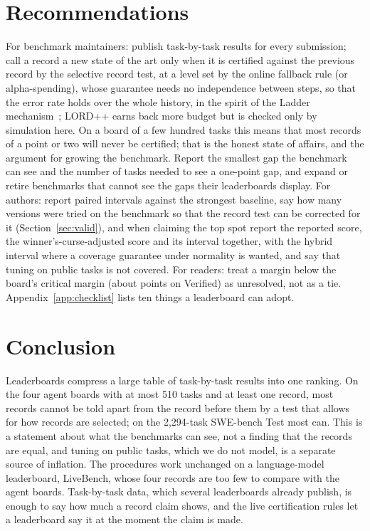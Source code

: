 \documentclass[11pt]{article}
\begin{document}
\section{Recommendations}
For benchmark maintainers: publish task-by-task results for every submission; call a record a new state of the art only when it is certified against the previous record by the selective record test, at a level set by the online fallback rule (or alpha-spending), whose guarantee needs no independence between steps, so that the error rate holds over the whole history, in the spirit of the Ladder mechanism~\citep{blum2015ladder}; LORD++ earns back more budget but is checked only by simulation here.
On a board of a few hundred tasks this means that most records of a point or two will never be certified; that is the honest state of affairs, and the argument for growing the benchmark.
Report the smallest gap the benchmark can see and the number of tasks needed to see a one-point gap, and expand or retire benchmarks that cannot see the gaps their leaderboards display.
For authors: report paired intervals against the strongest baseline, say how many versions were tried on the benchmark so that the record test can be corrected for it (Section~\ref{sec:valid}), and when claiming the top spot report the reported score, the winner's-curse-adjusted score and its interval together, with the hybrid interval where a coverage guarantee under normality is wanted, and say that tuning on public tasks is not covered.
For readers: treat a margin below the board's critical margin (about \NumVerifiedCritMargin{} points on Verified) as unresolved, not as a tie.
Appendix~\ref{app:checklist} lists ten things a leaderboard can adopt.

\section{Conclusion}
Leaderboards compress a large table of task-by-task results into one ranking.
On the four agent boards with at most 510 tasks and at least one record, most records cannot be told apart from the record before them by a test that allows for how records are selected; on the 2{,}294-task SWE-bench Test most can.
This is a statement about what the benchmarks can see, not a finding that the records are equal, and tuning on public tasks, which we do not model, is a separate source of inflation.
The procedures work unchanged on a language-model leaderboard, LiveBench, whose four records are too few to compare with the agent boards.
Task-by-task data, which several leaderboards already publish, is enough to say how much a record claim shows, and the live certification rules let a leaderboard say it at the moment the claim is made.
\end{document}
